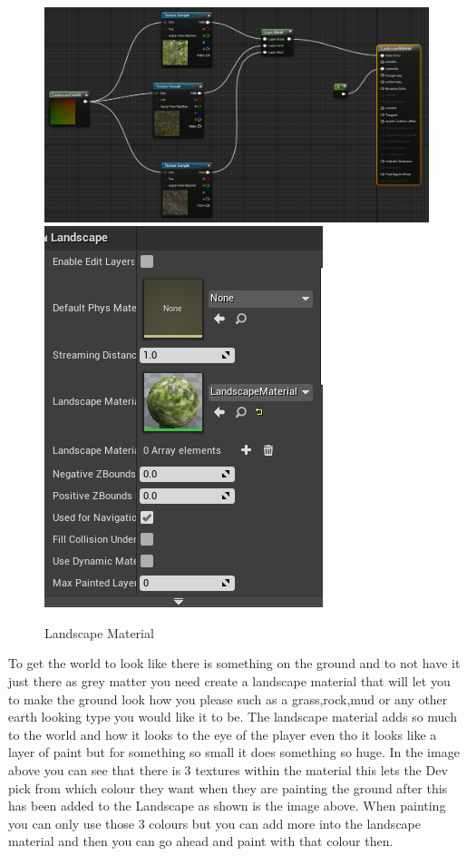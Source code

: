 \begin{figure}[H]
    \centering
    \includegraphics[scale=.5]{img/LandscapeMat.PNG}
    \includegraphics[scale=.5]{img/LScape.PNG}
    \caption{Landscape Material}
    \label{Level Design}
\end{figure}
To get the world to look like there is something on the ground and to not have it just there as grey matter you need create a landscape material that will let you to make the ground look how you please such as a grass,rock,mud or any other earth looking type you would like it to be. The landscape material adds so much to the world and how it looks to the eye of the player even tho it looks like a layer of paint but for something so small it does something so huge. In the image above you can see that there is 3 textures within the material this lets the Dev pick from which colour they want when they are painting the ground after this has been added to the Landscape as shown is the image above. When painting you can only use those 3 colours but you can add more into the landscape material and then you can go ahead and paint with that colour then. 

